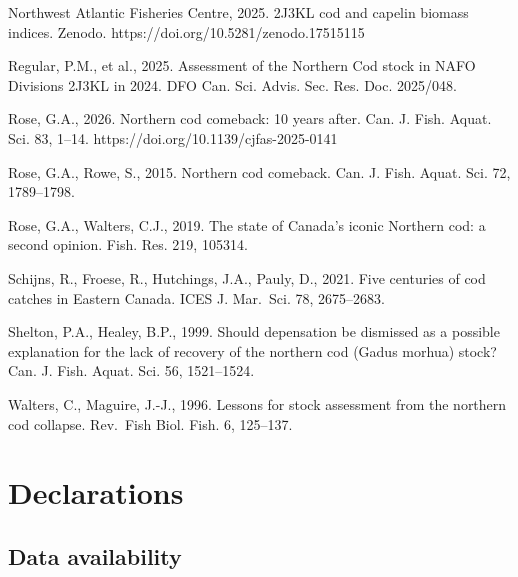 \documentclass[11pt]{article}
\begin{document}
Northwest Atlantic Fisheries Centre, 2025. 2J3KL cod and capelin biomass
indices. Zenodo. https://doi.org/10.5281/zenodo.17515115

Regular, P.M., et al., 2025. Assessment of the Northern Cod stock in
NAFO Divisions 2J3KL in 2024. DFO Can. Sci. Advis. Sec. Res. Doc.
2025/048.

Rose, G.A., 2026. Northern cod comeback: 10 years after. Can. J. Fish.
Aquat. Sci. 83, 1--14. https://doi.org/10.1139/cjfas-2025-0141

Rose, G.A., Rowe, S., 2015. Northern cod comeback. Can. J. Fish. Aquat.
Sci. 72, 1789--1798.

Rose, G.A., Walters, C.J., 2019. The state of Canada's iconic Northern
cod: a second opinion. Fish. Res. 219, 105314.

Schijns, R., Froese, R., Hutchings, J.A., Pauly, D., 2021. Five
centuries of cod catches in Eastern Canada. ICES J. Mar.~Sci. 78,
2675--2683.

Shelton, P.A., Healey, B.P., 1999. Should depensation be dismissed as a
possible explanation for the lack of recovery of the northern cod (Gadus
morhua) stock? Can. J. Fish. Aquat. Sci. 56, 1521--1524.

Walters, C., Maguire, J.-J., 1996. Lessons for stock assessment from the
northern cod collapse. Rev.~Fish Biol. Fish. 6, 125--137.

\section*{Declarations}

\subsection*{Data availability}
\end{document}
